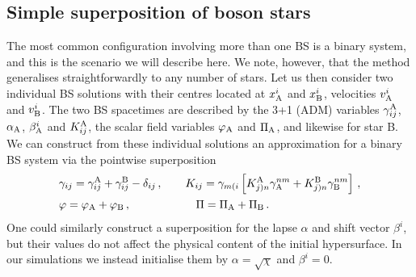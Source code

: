 \documentclass[]{iopart}
\begin{document}
\subsection{Simple superposition of boson stars}
%
\label{sec:superpossimple}
The most common configuration involving more than one BS
is a binary system, and this is the scenario we will
describe here. We note, however, that the method
generalises straightforwardly to any number of stars.
Let us then consider two individual BS solutions
with their centres located at $x^i_{\rm A}$ and $x^i_{\rm B}$,
velocities $v_{\rm A}^i$ and $v_{\rm B}^i$.
The two BS spacetimes are
described by the 3+1 (ADM) variables $\gamma_{ij}^{\rm A}$,
$\alpha_{\rm A}$, $\beta_{\rm A}^i$ and $K_{ij}^{\rm A}$,
the scalar field variables $\varphi_{\rm A}$ and $\Pi_{\rm A}$,
and likewise for star B. We can construct from these
individual solutions an approximation for a binary BS system
via the pointwise superposition
%
\begin{align}
  &\gamma_{ij} =
  \gamma_{ij}^{\rm A}
  +\gamma_{ij}^{\rm B}
  -\delta_{ij}\,,~~~~~~
  K_{ij} = \gamma_{m(i}
  \left[
  K^{\rm A}_{j)n}
  \gamma_{\rm A}^{nm}
  +K^{\rm B}_{j)n}
  \gamma_{\rm B}^{nm}
  \right]\,,
  \nonumber \\
  &\varphi = \varphi_{\rm A} + \varphi_{\rm B}\,,
  \hspace{0.85cm}~~~~~~~~~~
  \Pi = \Pi_{\rm A} + \Pi_{\rm B}\,.
  \label{eq:superpossimple}
\end{align}
%
One could similarly construct a superposition for the lapse
$\alpha$ and shift vector $\beta^i$, but their values do not
affect the physical content of the initial hypersurface.
In our simulations we instead initialise them by
$\alpha=\sqrt{\chi}$ and $\beta^i=0$.
\end{document}
